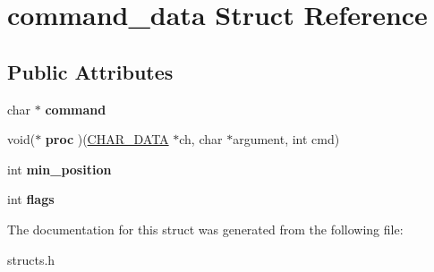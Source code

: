 \hypertarget{structcommand__data}{\section{command\-\_\-data Struct Reference}
\label{structcommand__data}
}
\subsection*{Public Attributes}
\begin{DoxyCompactItemize}
\item 
\hypertarget{structcommand__data_a7973dbece8d04ab7a146500721efde6f}{char $\ast$ {\bfseries command}}\label{structcommand__data_a7973dbece8d04ab7a146500721efde6f}

\item 
\hypertarget{structcommand__data_a39db54ac3e5c2e63cde48047b94adc07}{void($\ast$ {\bfseries proc} )(\hyperlink{structchar__data}{C\-H\-A\-R\-\_\-\-D\-A\-T\-A} $\ast$ch, char $\ast$argument, int cmd)}\label{structcommand__data_a39db54ac3e5c2e63cde48047b94adc07}

\item 
\hypertarget{structcommand__data_a90ec821dd6eb3eb1740ffd2dacc28fc8}{int {\bfseries min\-\_\-position}}\label{structcommand__data_a90ec821dd6eb3eb1740ffd2dacc28fc8}

\item 
\hypertarget{structcommand__data_a3737745e9257a92a59402b56340ac250}{int {\bfseries flags}}\label{structcommand__data_a3737745e9257a92a59402b56340ac250}

\end{DoxyCompactItemize}


The documentation for this struct was generated from the following file\-:\begin{DoxyCompactItemize}
\item 
structs.\-h\end{DoxyCompactItemize}
